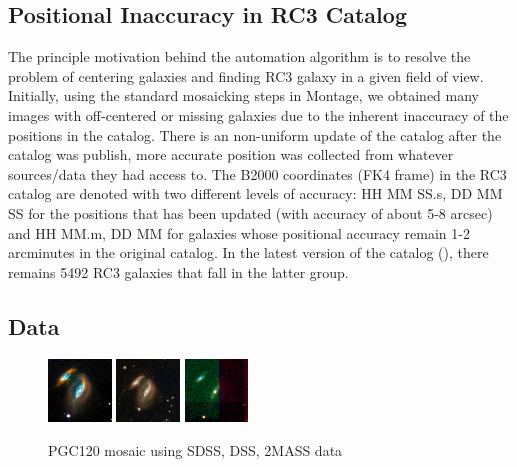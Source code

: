 \documentclass[5p]{elsarticle}
\begin{document}
	\subsection{Positional Inaccuracy in RC3 Catalog}
	\label{sec:position}
	The principle motivation behind the automation algorithm is to resolve the problem of centering galaxies and finding RC3 galaxy in a given field of view. Initially, using the standard mosaicking steps in Montage, we obtained many images with  off-centered or missing galaxies due to the inherent inaccuracy of the positions in the catalog. 
There is an non-uniform update of the catalog after the catalog was publish, more accurate position was collected from whatever sources/data they had access to.
The B2000 coordinates (FK4 frame) in the RC3 catalog are denoted with two different levels of accuracy: HH MM SS.s, DD MM SS for the positions that has been updated  (with accuracy of about 5-8 arcsec) and  HH MM.m, DD MM for galaxies whose positional accuracy remain  1-2 arcminutes in the original catalog.  In the latest version of the catalog (\citet{rc31991}), there remains 5492 RC3 galaxies that fall in the latter group.
\subsection{Data}
\begin{figure}[h]
	\includegraphics[width=0.15\textwidth]{figures/SDSS_120_LOW}
	\includegraphics[width=0.15\textwidth]{figures/DSS_120_BEST}	
	\includegraphics[width=0.15\textwidth]{figures/2MASS_120_BEST}
	\caption{PGC120 mosaic using SDSS, DSS, 2MASS data }
\end{figure}
\end{document}
